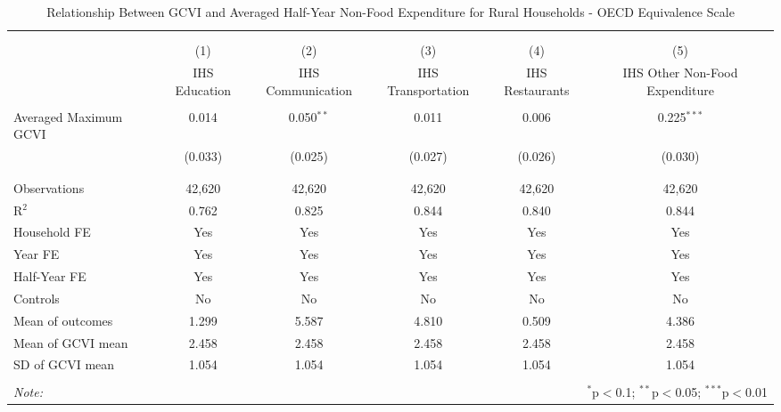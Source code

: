 
\begin{table}[!htbp] \centering 
  \caption{Relationship Between GCVI and Averaged Half-Year Non-Food Expenditure for Rural Households - OECD Equivalence Scale} 
  \label{gcvi_table_4_2_rural.tex} 
\normalsize 
\begin{tabular}{@{\extracolsep{5pt}}lccccc} 
\\[-1.8ex]\hline 
\hline \\[-1.8ex] 
\\[-1.8ex] & (1) & (2) & (3) & (4) & (5)\\ 
 & IHS Education & IHS Communication & IHS Transportation & IHS Restaurants & IHS Other Non-Food Expenditure \\ 
\hline \\[-1.8ex] 
 Averaged Maximum GCVI & 0.014 & 0.050$^{**}$ & 0.011 & 0.006 & 0.225$^{***}$ \\ 
  & (0.033) & (0.025) & (0.027) & (0.026) & (0.030) \\ 
  & & & & & \\ 
\hline \\[-1.8ex] 
Observations & 42,620 & 42,620 & 42,620 & 42,620 & 42,620 \\ 
R$^{2}$ & 0.762 & 0.825 & 0.844 & 0.840 & 0.844 \\ 
Household FE & Yes & Yes & Yes & Yes & Yes \\ 
Year FE & Yes & Yes & Yes & Yes & Yes \\ 
Half-Year FE & Yes & Yes & Yes & Yes & Yes \\ 
Controls & No & No & No & No & No \\ 
Mean of outcomes & 1.299 & 5.587 & 4.810 & 0.509 & 4.386 \\ 
Mean of GCVI mean & 2.458 & 2.458 & 2.458 & 2.458 & 2.458 \\ 
SD of GCVI mean & 1.054 & 1.054 & 1.054 & 1.054 & 1.054 \\ 
\hline \\[-1.8ex] 
\textit{Note:}  & \multicolumn{5}{r}{$^{*}$p$<$0.1; $^{**}$p$<$0.05; $^{***}$p$<$0.01} \\ 
\end{tabular} 
\end{table} 
